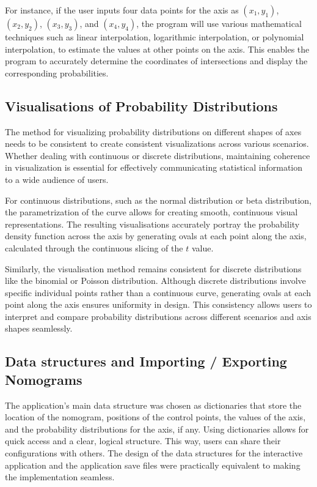 \documentclass{l4proj}
\begin{document}
For instance, if the user inputs four data points for the axis as $(x_1, y_1)$, $(x_2, y_2)$, $(x_3, y_3)$, and $(x_4, y_4)$, the program will use various mathematical techniques such as linear interpolation, logarithmic interpolation, or polynomial interpolation, to estimate the values at other points on the axis. This enables the program to accurately determine the coordinates of intersections and display the corresponding probabilities.


\subsection{Visualisations of Probability Distributions}

The method for visualizing probability distributions on different shapes of axes needs to be consistent to create consistent visualizations across various scenarios. Whether dealing with continuous or discrete distributions, maintaining coherence in visualization is essential for effectively communicating statistical information to a wide audience of users. 

For continuous distributions, such as the normal distribution or beta distribution, the parametrization of the curve allows for creating smooth, continuous visual representations. The resulting visualisations accurately portray the probability density function across the axis by generating ovals at each point along the axis, calculated through the continuous slicing of the $t$ value.

Similarly, the visualisation method remains consistent for discrete distributions like the binomial or Poisson distribution. Although discrete distributions involve specific individual points rather than a continuous curve, generating ovals at each point along the axis ensures uniformity in design. This consistency allows users to interpret and compare probability distributions across different scenarios and axis shapes seamlessly. 


\subsection{Data structures and Importing / Exporting Nomograms }

The application's main data structure was chosen as dictionaries that store the location of the nomogram, positions of the control points, the values of the axis, and the probability distributions for the axis, if any. Using dictionaries allows for quick access and a clear, logical structure. This way, users can share their configurations with others. The design of the data structures for the interactive application and the application save files were practically equivalent to making the implementation seamless. 
\end{document}

